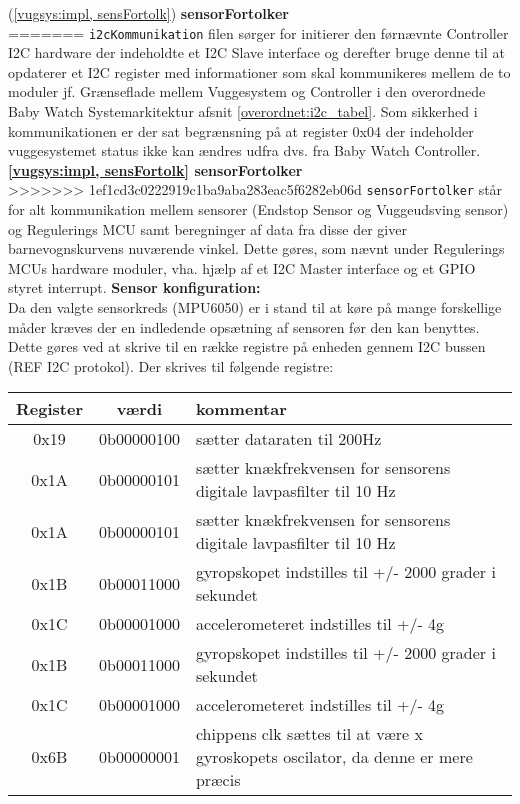 \label{vugsys:impl, sensFortolk} (\ref{vugsys:impl, sensFortolk}) \textbf{sensorFortolker}  \\
=======
\verb+i2cKommunikation+ filen sørger for initierer den førnævnte Controller I2C hardware der indeholdte et I2C Slave interface og derefter bruge denne til at opdaterer et I2C register med informationer som skal kommunikeres mellem de to moduler jf. Grænseflade mellem Vuggesystem og Controller i den overordnede Baby Watch Systemarkitektur afsnit \ref{overordnet:i2c_tabel}. Som sikkerhed i kommunikationen er der sat begrænsning på at register 0x04 der indeholder vuggesystemet status ikke kan ændres udfra dvs. fra Baby Watch Controller.\\
\label{vugsys:impl, sensFortolk}\textbf{\ref{vugsys:impl, sensFortolk} sensorFortolker}  \\
>>>>>>> 1ef1cd3c0222919c1ba9aba283eac5f6282eb06d
\verb+sensorFortolker+ står for alt kommunikation mellem sensorer (Endstop Sensor og Vuggeudsving sensor) og Regulerings MCU samt beregninger af data fra disse der giver barnevognskurvens nuværende vinkel. Dette gøres, som nævnt under Regulerings MCUs hardware moduler, vha. hjælp af et I2C Master interface og et GPIO styret interrupt. 
\textbf{Sensor konfiguration:} \\
Da den valgte sensorkreds (MPU6050) er i stand til at køre på mange forskellige måder kræves der en indledende opsætning af sensoren før den kan benyttes. Dette gøres ved at skrive til en række registre på enheden gennem I2C bussen (REF I2C protokol). Der skrives til følgende registre:
\begin{center}
    \begin{tabular}{| c | c | p{8cm} |}
    \hline
    \textbf{Register}	& \textbf{værdi} & \textbf{kommentar} \\ \hline
    0x19 & 0b00000100 & sætter dataraten til 200Hz \\
    0x1A & 0b00000101 & sætter knækfrekvensen for sensorens digitale lavpasfilter til 10 Hz \\
    0x1A & 0b00000101 & sætter knækfrekvensen for sensorens digitale lavpasfilter til 10 Hz \\
    0x1B & 0b00011000 & gyropskopet indstilles til +/- 2000 grader i sekundet  \\
    0x1C & 0b00001000 & accelerometeret indstilles til +/- 4g \\
    0x1B & 0b00011000 & gyropskopet indstilles til +/- 2000 grader i sekundet  \\
    0x1C & 0b00001000 & accelerometeret indstilles til +/- 4g \\
    0x6B & 0b00000001 & chippens clk sættes til at være x gyroskopets oscilator, da denne er mere præcis \\ \hline
    \end{tabular}
\end{center}

